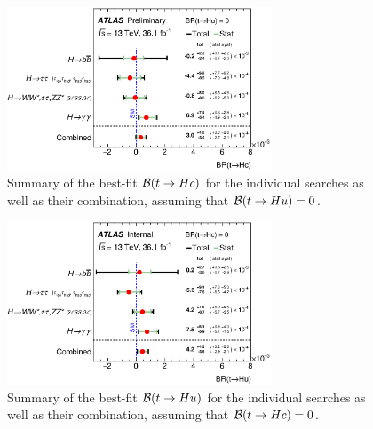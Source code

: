 \begin{figure}[t!]
\begin{center}
\includegraphics[width=0.7\textwidth]{figures/Combo/POI.eps}
\caption{\small {Summary of the best-fit $\mathcal{B}(t\to Hc)$ for the individual searches as well as their combination,
assuming that $\mathcal{B}(t\to Hu)=0$. }}
\label{fig:summary_printnum_hc} 
\end{center}
\end{figure}
\begin{figure}[h!]
\begin{center}
\includegraphics[width=0.7\textwidth]{figures/Combo/POI2.eps}
\caption{\small {Summary of the best-fit $\mathcal{B}(t\to Hu)$ for the individual searches as well as their combination,
assuming that $\mathcal{B}(t\to Hc)=0$. }}
\label{fig:summary_printnum_hu} 
\end{center}
\end{figure}


